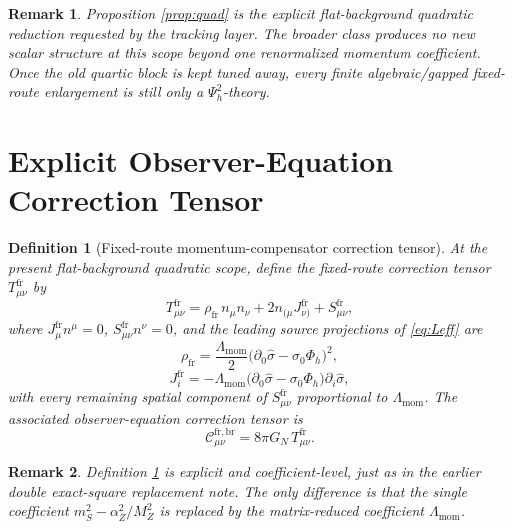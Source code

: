 \documentclass[11pt]{article}
\newtheorem{definition}{Definition}
\newtheorem{remark}{Remark}
\begin{document}
\begin{remark}
Proposition \ref{prop:quad} is the explicit flat-background quadratic reduction requested by the tracking layer. The broader class produces no new scalar structure at this scope beyond one renormalized momentum coefficient. Once the old quartic block is kept tuned away, every finite algebraic/gapped fixed-route enlargement is still only a \(\Psi_h^2\)-theory.
\end{remark}

\section{Explicit Observer-Equation Correction Tensor}

\begin{definition}[Fixed-route momentum-compensator correction tensor]
\label{def:Tfr}
At the present flat-background quadratic scope, define the \emph{fixed-route correction tensor} \(T_{\mu\nu}^{\mathrm{fr}}\) by
\begin{equation}
T_{\mu\nu}^{\mathrm{fr}}
=
\rho_{\mathrm{fr}}\,n_\mu n_\nu
+2n_{(\mu}J_{\nu)}^{\mathrm{fr}}
+S_{\mu\nu}^{\mathrm{fr}},
\label{eq:Tfr}
\end{equation}
where \(J_\mu^{\mathrm{fr}}n^\mu=0\), \(S_{\mu\nu}^{\mathrm{fr}}n^\nu=0\), and the leading source projections of \eqref{eq:Leff} are
\begin{equation}
\rho_{\mathrm{fr}}
=
\frac{\Lambda_{\mathrm{mom}}}{2}
\bigl(\partial_0\hat\sigma-\sigma_0\Phi_h\bigr)^2,
\label{eq:rhofr}
\end{equation}
\begin{equation}
J_i^{\mathrm{fr}}
=
-\Lambda_{\mathrm{mom}}
\bigl(\partial_0\hat\sigma-\sigma_0\Phi_h\bigr)\partial_i\hat\sigma,
\label{eq:Jfr}
\end{equation}
with every remaining spatial component of \(S_{\mu\nu}^{\mathrm{fr}}\) proportional to \(\Lambda_{\mathrm{mom}}\). The associated observer-equation correction tensor is
\begin{equation}
\mathcal C_{\mu\nu}^{\mathrm{fr,br}}
=
8\pi G_N\,T_{\mu\nu}^{\mathrm{fr}}.
\label{eq:Cfr}
\end{equation}
\end{definition}

\begin{remark}
Definition \ref{def:Tfr} is explicit and coefficient-level, just as in the earlier double exact-square replacement note. The only difference is that the single coefficient \(m_S^2-\alpha_Z^2/M_Z^2\) is replaced by the matrix-reduced coefficient \(\Lambda_{\mathrm{mom}}\).
\end{remark}
\end{document}
